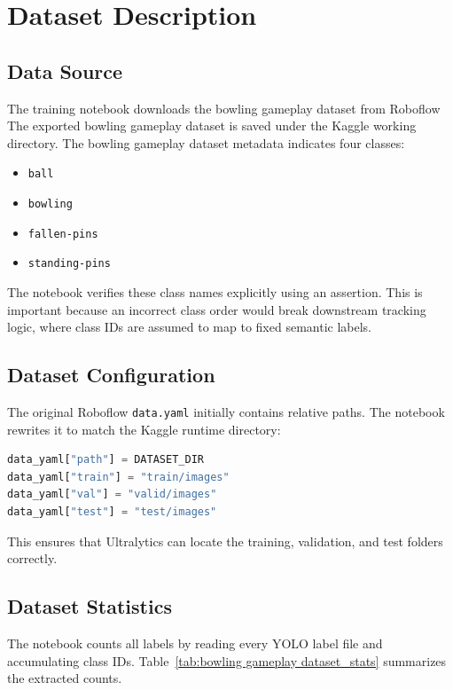 \documentclass[12pt,a4paper]{article}
\begin{document}
\section{Dataset Description}

\subsection{Data Source}

The training notebook downloads the bowling gameplay dataset from Roboflow
The exported bowling gameplay dataset is saved under the Kaggle working directory. The bowling gameplay dataset metadata indicates four classes:
\begin{itemize}[noitemsep]
    \item \texttt{ball}
    \item \texttt{bowling}
    \item \texttt{fallen-pins}
    \item \texttt{standing-pins}
\end{itemize}

The notebook verifies these class names explicitly using an assertion. This is important because an incorrect class order would break downstream tracking logic, where class IDs are assumed to map to fixed semantic labels.

\subsection{Dataset Configuration}

The original Roboflow \texttt{data.yaml} initially contains relative paths. The notebook rewrites it to match the Kaggle runtime directory:

\begin{lstlisting}[language=Python]
data_yaml["path"] = DATASET_DIR
data_yaml["train"] = "train/images"
data_yaml["val"] = "valid/images"
data_yaml["test"] = "test/images"
\end{lstlisting}

This ensures that Ultralytics can locate the training, validation, and test folders correctly.

\subsection{Dataset Statistics}

The notebook counts all labels by reading every YOLO label file and accumulating class IDs. Table~\ref{tab:bowling gameplay dataset_stats} summarizes the extracted counts.
\end{document}
